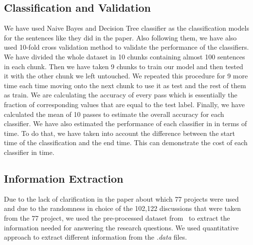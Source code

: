\subsection{Classification and Validation}
We have used Naive Bayes and Decision Tree classifier as the classification models for the sentences like they did in the paper. Also following them, we have also used 10-fold cross validation method to validate the performance of the classifiers. We have divided the whole dataset in 10 chunks containing almost 100 sentences in each chunk. Then we have taken 9 chunks to train our model and then tested it with the other chunk we left untouched. We repeated this procedure for 9 more time each time moving onto the next chunk to use it as test and the rest of them as train. We are calculating the accuracy of every pass which is essentially the fraction of corresponding values that are equal to the test label. Finally, we have calculated the mean of 10 passes to estimate the overall accuracy for each classifier. We have also estimated the performance of each classifier in in terms of time. To do that, we have taken into account the difference between the start time of the classification and the end time. This can demonstrate the cost of each classifier in time.

\subsection{Information Extraction}
Due to the lack of clarification in the paper about which 77 projects were used and due to the randomness in choice of the 102,122 discussions that were taken from the 77 project, we used the pre-processed dataset from~\cite{Brunet2014a} to extract the information needed for answering the research questions. We used quantitative approach to extract different information from the \emph{.data} files.  